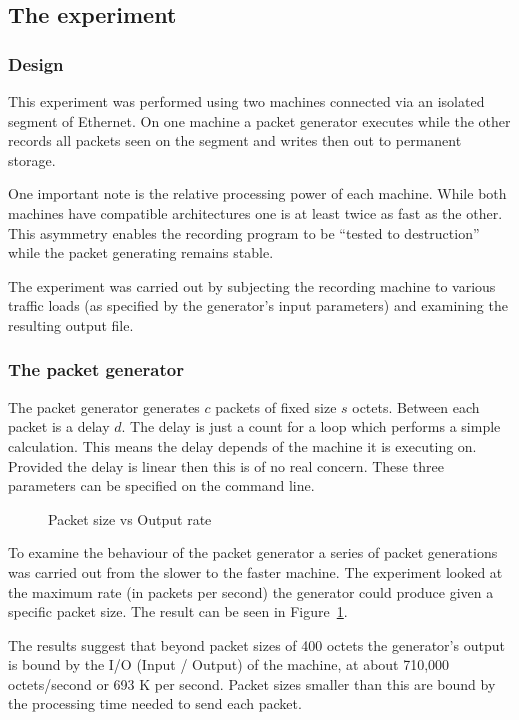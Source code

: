 \subsection{The experiment}

\subsubsection{Design}

This experiment was performed using two machines connected via an
isolated segment of Ethernet.  On one machine a packet generator
executes while the other records all packets seen on the segment and
writes then out to permanent storage.

One important note is the relative processing power of each machine.
While both machines have compatible architectures one is at least
twice as fast as the other.  This asymmetry enables the recording
program to be ``tested to destruction'' while the packet generating
remains stable.

The experiment was carried out by subjecting the recording machine to
various traffic loads (as specified by the generator's input
parameters) and examining the resulting output file.

\subsubsection{The packet generator}

The packet generator generates $c$ packets of fixed size $s$ octets.
Between each packet is a delay $d$.  The delay is just a count for a
loop which performs a simple calculation.  This means the delay
depends of the machine it is executing on.  Provided the delay is
linear then this is of no real concern.  These three parameters can be
specified on the command line.

\begin{figure}
\leavevmode
{}
\caption{Packet size vs Output rate}
\label{Expr:fig1}
\end{figure}

To examine the behaviour of the packet generator a series of packet
generations was carried out from the slower to the faster machine.
The experiment looked at the maximum rate (in packets per second) the
generator could produce given a specific packet size.  The result can
be seen in Figure~\ref{Expr:fig1}.

The results suggest that beyond packet sizes of 400 octets the
generator's output is bound by the I/O (Input / Output) of the
machine, at about 710,000 octets/second or 693 K per second.  Packet
sizes smaller than this are bound by the processing time needed to
send each packet.
